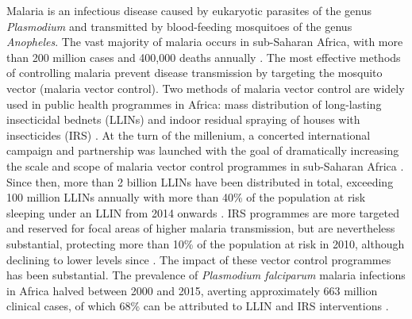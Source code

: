 \documentclass[a4paper,11pt,abstracton,hidelinks]{scrartcl}
\begin{document}
Malaria is an infectious disease caused by eukaryotic parasites of the genus \textit{Plasmodium} and transmitted by blood-feeding mosquitoes of the genus \textit{Anopheles}.
%
The vast majority of malaria occurs in sub-Saharan Africa, with more than 200 million cases and 400,000 deaths annually \citep{WHO2019WMR}.
%
The most effective methods of controlling malaria prevent disease transmission by targeting the mosquito vector (malaria vector control).
%
Two methods of malaria vector control are widely used in public health programmes in Africa: mass distribution of long-lasting insecticidal bednets (LLINs)
\citep{Carnevale2019,Okumu2020} and indoor residual spraying of houses with insecticides (IRS) \citep{WHO2006IRS,Pluess2010,Choi2019}.
%
At the turn of the millenium, a concerted international campaign and partnership was launched with the goal of dramatically increasing the scale and scope of malaria vector control programmes in sub-Saharan Africa \citep{Nabarro1998}.
%
Since then, more than 2 billion LLINs have been distributed in total, exceeding 100 million LLINs annually \citep{AMP2020} with more than 40\% of the population at risk sleeping under an LLIN from 2014 onwards \citep{Bhatt2015,WHO2019WMR}.
%
IRS programmes are more targeted and reserved for focal areas of higher malaria transmission, but are nevertheless substantial, protecting more than 10\% of the population at risk in 2010, although declining to lower levels since \citep{Bhatt2015,WHO2019WMR,Tangena2020}. 
%
The impact of these vector control programmes has been substantial. 
%
The prevalence of \textit{Plasmodium falciparum} malaria infections in Africa halved between 2000 and 2015, averting approximately 663 million clinical cases, of which 68\% can be attributed to LLIN and IRS interventions \citep{Bhatt2015}.


\printbibliography
\end{document}
